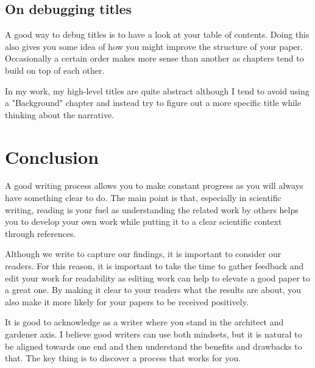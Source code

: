 \subsection{On debugging titles}

A good way to debug titles is to have a look at your table of contents.
Doing this also gives you some idea of how you might improve the structure of your paper.
Occasionally a certain order makes more sense than another as chapters tend to build on top of each other.

In my work, my high-level titles are quite abstract although I tend to avoid using a "Background" chapter and instead try to figure out a more specific title while thinking about the narrative.

\section{Conclusion}

A good writing process allows you to make constant progress as you will always have something clear to do.
The main point is that, especially in scientific writing, reading is your fuel as understanding the related work by others helps you to develop your own work while putting it to a clear scientific context through references.

Although we write to capture our findings, it is important to consider our readers.
For this reason, it is important to take the time to gather feedback and edit your work for readability as editing work can help to elevate a good paper to a great one.
By making it clear to your readers what the results are about, you also make it more likely for your papers to be received positively.

It is good to acknowledge as a writer where you stand in the architect and gardener axis.
I believe good writers can use both mindsets, but it is natural to be aligned towards one end and then understand the benefits and drawbacks to that.
The key thing is to discover a process that works for you.

